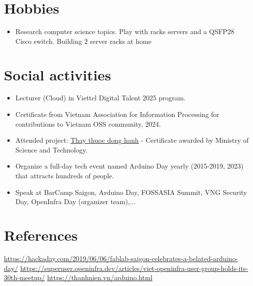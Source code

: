 \documentclass[letterpaper,11pt]{article}
\newcommand{\resumeItemNornal}[1]{
  \item\small{
    {#1 \vspace{-2pt}}
  }
}
\newcommand{\resumeSubItemNormal}[1]{\resumeItemNornal{#1}\vspace{-4pt}}
\newcommand{\resumeSubHeadingListStart}{\begin{itemize}[leftmargin=*]}
\newcommand{\resumeSubHeadingListEnd}{\end{itemize}}
\begin{document}
\section{Hobbies}
  \resumeSubHeadingListStart
    \resumeSubItemNormal
      {Research computer science topics. Play with racks servers and a QSFP28 Cisco switch. Building 2 server racks at home}
\resumeSubHeadingListEnd

\section{Social activities}
  \resumeSubHeadingListStart
    \resumeSubItemNormal
      {Lecturer (Cloud) in Viettel Digital Talent 2025 program.}
    \resumeSubItemNormal
      {Certificate from Vietnam Association for Information Processing for contributions to Vietnam OSS community, 2024.}
    \resumeSubItemNormal
      {Attended project: \href{https://thaythuocdonghanh.vn}{Thay thuoc dong hanh} - Certificate awarded by Ministry of Science and Technology.}
    \resumeSubItemNormal
      {Organize a full-day tech event named Arduino Day yearly (2015-2019, 2023) that attracts hundreds of people.}
    \resumeSubItemNormal
      {Speak at BarCamp Saigon, Arduino Day, FOSSASIA Summit, VNG Security Day, OpenInfra Day (organizer team),...}
\resumeSubHeadingListEnd

\section{References}
    \small{\href{https://hackaday.com/2019/06/06/fablab-saigon-celebrates-a-belated-arduino-day/}{https://hackaday.com/2019/06/06/fablab-saigon-celebrates-a-belated-arduino-day/}}
    \small{\href{https://superuser.openinfra.dev/articles/viet-openinfra-user-group-holds-its-30th-meetup/}{https://superuser.openinfra.dev/articles/viet-openinfra-user-group-holds-its-30th-meetup/}}\newline
    \small{\href{https://thanhnien.vn/vi-sao-nhieu-nguoi-me-arduino-nen-tang-duoc-cho-la-tien-than-cua-giao-duc-stem-185230704165819482.htm}{https://thanhnien.vn/arduino.html}}
   
\end{document}
